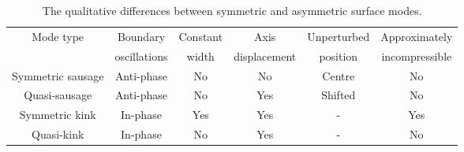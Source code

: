 \begin{sidewaystable}
	\centering
	\begin{tabular}{cccccc}
		\toprule
		\multirow{2}{*}{Mode type} & Boundary & Constant & Axis & Unperturbed & Approximately \\
		 & oscillations & width & displacement & position & incompressible \\
		\midrule
		Symmetric sausage & Anti-phase & No & No & Centre & No \\
		Quasi-sausage & Anti-phase & No & Yes & Shifted & No \\
		Symmetric kink & In-phase & Yes & Yes & - & Yes \\
		Quasi-kink & In-phase & No	& Yes & - & No \\
		\bottomrule
	\end{tabular}
	\caption{The qualitative differences between symmetric and asymmetric surface modes.}
	\label{tab: eigenmode differences}
\end{sidewaystable}


